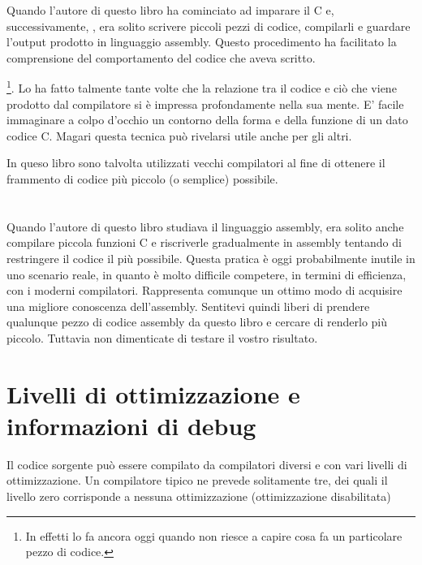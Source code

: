 \chapterold{\ITAph{}}

Quando l'autore di questo libro ha cominciato ad imparare il C e, successivamente, \Cpp, era solito scrivere piccoli pezzi di codice, compilarli e guardare l'output prodotto in linguaggio assembly. Questo procedimento ha facilitato la comprensione del comportamento del codice che aveva scritto.

\footnote{In effetti lo fa ancora oggi quando non riesce a capire cosa fa un particolare pezzo di codice.}. 
Lo ha fatto talmente tante volte che la relazione tra il codice \CCpp e ciò che viene prodotto dal compilatore si è impressa profondamente nella sua mente. E' facile immaginare a colpo d'occhio un contorno della forma e della funzione di un dato codice C. 
Magari questa tecnica può rivelarsi utile anche per gli altri.


In queso libro sono talvolta utilizzati vecchi compilatori al fine di ottenere il frammento di codice più piccolo (o semplice) possibile.

\section*{\Exercises}

Quando l'autore di questo libro studiava il linguaggio assembly, era solito anche compilare piccola funzioni C e riscriverle gradualmente in assembly tentando di restringere il codice il più possibile.
Questa pratica è oggi probabilmente inutile in uno scenario reale, in quanto è molto difficile competere, in termini di efficienza, con i moderni compilatori. Rappresenta comunque un ottimo modo di acquisire una migliore conoscenza dell'assembly.
Sentitevi quindi liberi di prendere qualunque pezzo di codice assembly da questo libro e cercare di renderlo più piccolo. Tuttavia non dimenticate di testare il vostro risultato.

\section*{Livelli di ottimizzazione e informazioni di debug}

Il codice sorgente può essere compilato da compilatori diversi e con vari livelli di ottimizzazione.
Un compilatore tipico ne prevede solitamente tre, dei quali il livello zero corrisponde a nessuna ottimizzazione (ottimizzazione disabilitata) 

